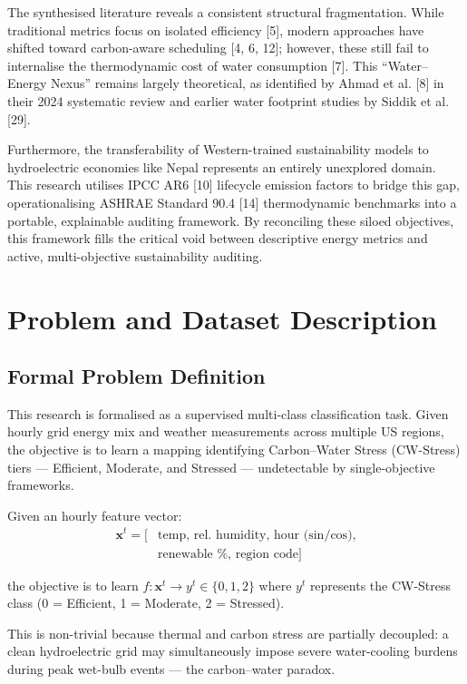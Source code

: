 \documentclass[conference]{IEEEtran}
\begin{document}
The synthesised literature reveals a consistent structural fragmentation. While traditional metrics focus on isolated efficiency [5], modern approaches have shifted toward carbon-aware scheduling [4, 6, 12]; however, these still fail to internalise the thermodynamic cost of water consumption [7]. This ``Water–Energy Nexus'' remains largely theoretical, as identified by Ahmad et al. [8] in their 2024 systematic review and earlier water footprint studies by Siddik et al. [29].

Furthermore, the transferability of Western-trained sustainability models to hydroelectric economies like Nepal represents an entirely unexplored domain. This research utilises IPCC AR6 [10] lifecycle emission factors to bridge this gap, operationalising ASHRAE Standard 90.4 [14] thermodynamic benchmarks into a portable, explainable auditing framework. By reconciling these siloed objectives, this framework fills the critical void between descriptive energy metrics and active, multi-objective sustainability auditing.



\section{Problem and Dataset Description}
\subsection{Formal Problem Definition}
This research is formalised as a supervised multi-class classification task. Given hourly grid energy mix and weather measurements across multiple US regions, the objective is to learn a mapping identifying Carbon–Water Stress (CW-Stress) tiers — Efficient, Moderate, and Stressed — undetectable by single-objective frameworks.

Given an hourly feature vector:
\begin{equation}
\begin{aligned}
\mathbf{x}^t = [&\text{temp, rel.\ humidity, hour (sin/cos),} \\
&\text{renewable \%, region code}]
\end{aligned}
\end{equation}

the objective is to learn $f: \mathbf{x}^t \rightarrow y^t \in \{0, 1, 2\}$ where $y^t$ represents the CW-Stress class (0 = Efficient, 1 = Moderate, 2 = Stressed).

This is non-trivial because thermal and carbon stress are partially decoupled: a clean hydroelectric grid may simultaneously impose severe water-cooling burdens during peak wet-bulb events — the carbon–water paradox.
\end{document}
